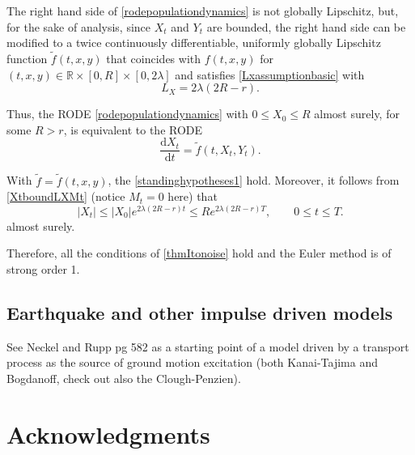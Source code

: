 \documentclass[reqno,12pt]{amsart}
\theoremstyle{plain}%
\theoremstyle{definition}
\begin{document}
The right hand side of \eqref{rodepopulationdynamics} is not globally Lipschitz, but, for the sake of analysis, since $X_t$ and $Y_t$ are bounded, the right hand side can be modified to a twice continuously differentiable, uniformly globally Lipschitz function $\tilde f(t, x, y)$ that coincides with $f(t, x, y)$ for $(t, x, y) \in \mathbb{R}\times [0, R]\times [0, 2\lambda]$ and satisfies \eqref{Lxassumptionbasic} with
\[
    L_X = 2\lambda (2R - r).
\]

Thus, the RODE \eqref{rodepopulationdynamics} with $0\leq X_0 \leq R$ almost surely, for some $R > r$, is equivalent to the RODE
\begin{equation}
    \label{rodepopulationdynamicstruncated}
    \frac{\mathrm{d}X_t}{\mathrm{d}t} = \tilde f(t, X_t, Y_t).
\end{equation}

With $\tilde f=\tilde f(t, x, y)$, the \cref{standinghypotheses1} hold. Moreover, it follows from \eqref{XtboundLXMt} (notice $M_t = 0$ here) that
\[
    |X_t| \leq |X_0|e^{2\lambda (2R - r)t} \leq R e^{2\lambda (2R - r)T}, \qquad 0 \leq t \leq T.
\]
almost surely. 

Therefore, all the conditions of \cref{thmItonoise} hold and the Euler method is of strong order 1.

\subsection{Earthquake and other impulse driven models}

See Neckel and Rupp pg 582 as a starting point of a model driven by a transport process as the source of ground motion excitation (both Kanai-Tajima and Bogdanoff, check out also the Clough-Penzien).

\section*{Acknowledgments}
\end{document}
